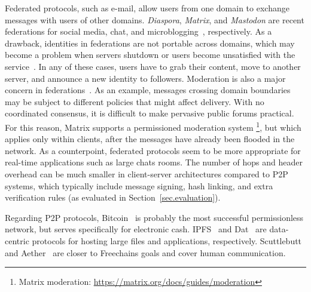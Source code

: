 \documentclass[12pt]{article}
\newcommand{\FC}       {Freechains\xspace}
\begin{document}

Federated protocols, such as e-mail, allow users from one domain to exchange
messages with users of other domains.
\emph{Diaspora}, \emph{Matrix}, and \emph{Mastodon} are recent federations for
social media, chat, and microblogging~\cite{p2p.ecosystem}, respectively.
%
As a drawback, identities in federations are not portable across domains, which
may become a problem when servers shutdown or users become unsatisfied with the
service~\cite{fed.distributed}.
In any of these cases, users have to grab their content, move to another
server, and announce a new identity to followers.
%
Moderation is also a major concern in federations~\cite{p2p.ecosystem}.
As an example, messages crossing domain boundaries may be subject to different
policies that might affect delivery.
With no coordinated consensus, it is difficult to make pervasive public forums
practical.
%
For this reason, Matrix supports a permissioned moderation system%
\footnote{Matrix moderation: \url{https://matrix.org/docs/guides/moderation}},
but which applies only within clients, after the messages have already been
flooded in the network.
%
As a counterpoint, federated protocols seem to be more appropriate for
real-time applications such as large chats rooms.
The number of hops and header overhead can be much smaller in client-server
architectures compared to P2P systems, which typically include message signing,
hash linking, and extra verification rules (as evaluated in
Section~\ref{sec.evaluation}).


Regarding P2P protocols, Bitcoin~\cite{p2p.bitcoin} is probably the most
successful permissionless network, but serves specifically for electronic
cash.
IPFS~\cite{p2p.ipfs} and Dat~\cite{p2p.dat} are data-centric protocols for
hosting large files and applications, respectively.
Scuttlebutt~\cite{p2p.scuttlebutt} and Aether~\cite{p2p.ecosystem} are closer
to \FC goals and cover human communication.
\end{document}
